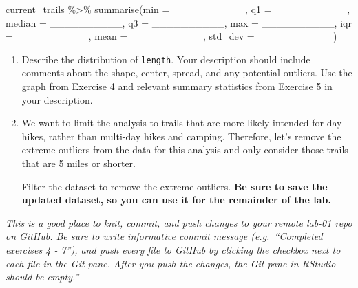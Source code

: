 \documentclass[
]{article}
\newenvironment{Shaded}{\begin{snugshade}}{\end{snugshade}}
\newcommand{\AttributeTok}[1]{\textcolor[rgb]{0.77,0.63,0.00}{#1}}
\newcommand{\FunctionTok}[1]{\textcolor[rgb]{0.00,0.00,0.00}{#1}}
\newcommand{\NormalTok}[1]{#1}
\newcommand{\SpecialCharTok}[1]{\textcolor[rgb]{0.00,0.00,0.00}{#1}}
\begin{document}
\begin{Shaded}
\begin{Highlighting}[]
\NormalTok{current\_trails }\SpecialCharTok{\%\textgreater{}\%}
  \FunctionTok{summarise}\NormalTok{(}\AttributeTok{min =}\NormalTok{ \_\_\_\_\_\_\_\_\_\_, }
            \AttributeTok{q1 =}\NormalTok{ \_\_\_\_\_\_\_\_\_\_, }
            \AttributeTok{median =}\NormalTok{ \_\_\_\_\_\_\_\_\_\_, }
            \AttributeTok{q3 =}\NormalTok{ \_\_\_\_\_\_\_\_\_\_, }
            \AttributeTok{max =}\NormalTok{ \_\_\_\_\_\_\_\_\_\_, }
            \AttributeTok{iqr =}\NormalTok{ \_\_\_\_\_\_\_\_\_\_, }
            \AttributeTok{mean =}\NormalTok{ \_\_\_\_\_\_\_\_\_\_, }
            \AttributeTok{std\_dev =}\NormalTok{ \_\_\_\_\_\_\_\_\_\_}
\NormalTok{            )}
\end{Highlighting}
\end{Shaded}

\begin{enumerate}
\def\labelenumi{\arabic{enumi}.}
\setcounter{enumi}{5}
\item
  Describe the distribution of \texttt{length}. Your description should
  include comments about the shape, center, spread, and any potential
  outliers. Use the graph from Exercise 4 and relevant summary
  statistics from Exercise 5 in your description.
\item
  We want to limit the analysis to trails that are more likely intended
  for day hikes, rather than multi-day hikes and camping. Therefore,
  let's remove the extreme outliers from the data for this analysis and
  only consider those trails that are 5 miles or shorter.

  Filter the dataset to remove the extreme outliers. \textbf{Be sure to
  save the updated dataset, so you can use it for the remainder of the
  lab.}
\end{enumerate}

\emph{This is a good place to knit, commit, and push changes to your
remote lab-01 repo on GitHub. Be sure to write informative commit
message (e.g.~``Completed exercises 4 - 7''), and push every file to
GitHub by clicking the checkbox next to each file in the Git pane. After
you push the changes, the Git pane in RStudio should be empty.''}
\end{document}
